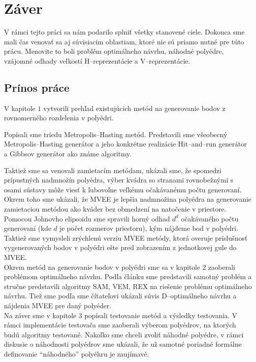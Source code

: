 \chapter*{Záver}  %

V rámci tejto práci sa nám podarilo splniť všetky stanovené ciele. Dokonca sme mali čas venovať sa aj súvisiacim oblastiam, ktoré nie sú priamo nutné pre túto prácu. Menovite to boli problém optimálneho návrhu, náhodné polyédre, vzájomné odhady veľkostí H--reprezentácie a V--reprezentácie.

\section{Prínos práce}
V kapitole $1$ vytvorili prehľad existujúcich metód na generovanie bodov z rovnomerného rozdelenia v polyédri.

Popísali sme triedu Metropolis--Hasting metód. Predstavili sme všeobecný Metropolis--Hasting generátor a jeho konkrétne realizácie Hit--and--run generátor a Gibbsov generátor ako známe algoritmy.

Taktiež sme sa venovali zamietacím metódam, ukázali sme, že spomedzi prípustných nadmnožín polyédra, výber kvádra so stranami rovnobežnými s osami sústavy môže viesť k ľubovoľne veľkému očakávanému počtu generovaní. Okrem toho sme ukázali, že MVEE je lepšia nadmnožina polyédra na generovanie zamietaciou metódou ako kváder bez obmedzení na natočenie v priestore. Pomocou Johnovho elipsoidu sme spravili horný odhad $d^d$ očakávaného počtu generovaní (kde $d$ je počet rozmerov priestoru), kým nájdeme bod v polyédri. Taktiež sme vymysleli zrýchlenú verziu MVEE metódy, ktorá overuje príslušnosť vygenerovaných bodov v polyédri ešte pred zobrazením z jednotkovej gule do MVEE.\\

Okrem metód na generovanie bodov v polyédri sme sa v kapitole $2$ zaoberali problémom optimálneho návrhu. Podľa článku \cite{rex_harman} sme predstavili samotný problém a stručne predstavili algoritmy SAM, VEM, REX na riešenie problému optimálneho návrhu. Tiež sme podľa \cite{rex_harman} sme čítateľovi ukázali súvis D--optimálneho návrhu a nájdenia MVEE pre daný polyéder.\\

Na záver sme v kapitole $3$ popísali testovanie metód a výsledky testovania. V rámci implementácie testovača sme zaoberali výberom polyédrov, na ktorých budú algoritmy testované. Nakoľko sme chceli zvoliť náhodné polyédre, v rámci diskusie o náhodnosti polyédrov sme ukázali, že už samotné poriadné formálne definovanie ``náhodného'' polyéhru je zaujímavé.

